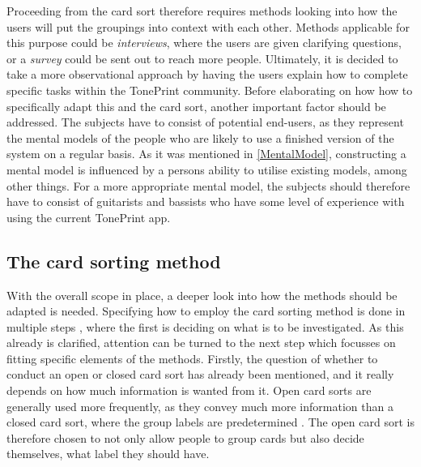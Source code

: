 Proceeding from the card sort therefore requires methods looking into how the users will put the groupings into context with each other. Methods applicable for this purpose could be \textit{interviews}, where the users are given clarifying questions, or a \textit{survey} could be sent out to reach more people. Ultimately, it is decided to take a more observational approach by having the users explain how to complete specific tasks within the TonePrint community. Before elaborating on how how to specifically adapt this and the card sort, another important factor should be addressed. The subjects have to consist of potential end-users, as they represent the mental models of the people who are likely to use a finished version of the system on a regular basis. As it was mentioned in \autoref{MentalModel}, constructing a mental model is influenced by a persons ability to utilise existing models, among other things. For a more appropriate mental model, the subjects should therefore have to consist of guitarists and bassists who have some level of experience with using the current TonePrint app.

\subsection{The card sorting method}
\label{CardSort}
With the overall scope in place, a deeper look into how the methods should be adapted is needed. Specifying how to employ the card sorting method is done in multiple steps \parencite[][8]{WEB:DonnaSpencer}, where the first is deciding on what is to be investigated. As this already is clarified, attention can be turned to the next step which focusses on fitting specific elements of the methods. Firstly, the question of whether to conduct an open or closed card sort has already been mentioned, and it really depends on how much information is wanted from it. Open card sorts are generally used more frequently, as they convey much more information than a closed card sort, where the group labels are predetermined \parencite[][82]{WEB:DonnaSpencer}. The open card sort is therefore chosen to not only allow people to group cards but also decide themselves, what label they should have.

